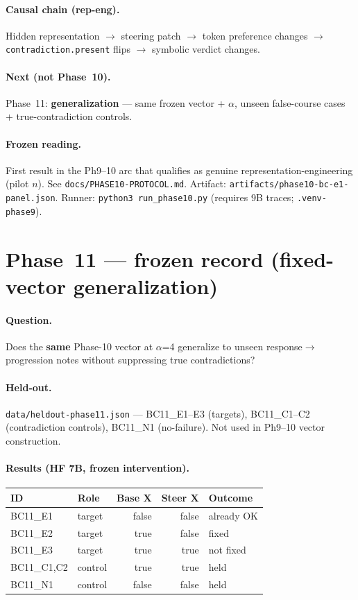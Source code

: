 \documentclass[11pt,a4paper]{article}
\begin{document}
\paragraph{Causal chain (rep-eng).}
Hidden representation $\rightarrow$ steering patch $\rightarrow$ token preference changes $\rightarrow$ \texttt{contradiction.present} flips $\rightarrow$ symbolic verdict changes.

\paragraph{Next (not Phase~10).}
Phase~11: \textbf{generalization} --- same frozen vector + $\alpha$, unseen false-course cases + true-contradiction controls.

\paragraph{Frozen reading.}
First result in the Ph9--10 arc that qualifies as genuine representation-engineering (pilot $n$).
See \texttt{docs/PHASE10-PROTOCOL.md}. Artifact: \texttt{artifacts/phase10-bc-e1-panel.json}.
Runner: \texttt{python3 run\_phase10.py} (requires 9B traces; \texttt{.venv-phase9}).

\section{Phase~11 --- frozen record (fixed-vector generalization)}

\paragraph{Question.}
Does the \textbf{same} Phase-10 vector at $\alpha$=4 generalize to unseen response$\rightarrow$progression notes without suppressing true contradictions?

\paragraph{Held-out.}
\texttt{data/heldout-phase11.json} --- BC11\_E1--E3 (targets), BC11\_C1--C2 (contradiction controls), BC11\_N1 (no-failure). Not used in Ph9--10 vector construction.

\paragraph{Results (HF 7B, frozen intervention).}
\begin{center}
\small
\begin{tabular}{llrrl}
\toprule
ID & Role & Base X & Steer X & Outcome \\
\midrule
BC11\_E1 & target & false & false & already OK \\
BC11\_E2 & target & true & false & fixed \\
BC11\_E3 & target & true & true & not fixed \\
BC11\_C1,C2 & control & true & true & held \\
BC11\_N1 & control & false & false & held \\
\bottomrule
\end{tabular}
\end{center}
\end{document}
